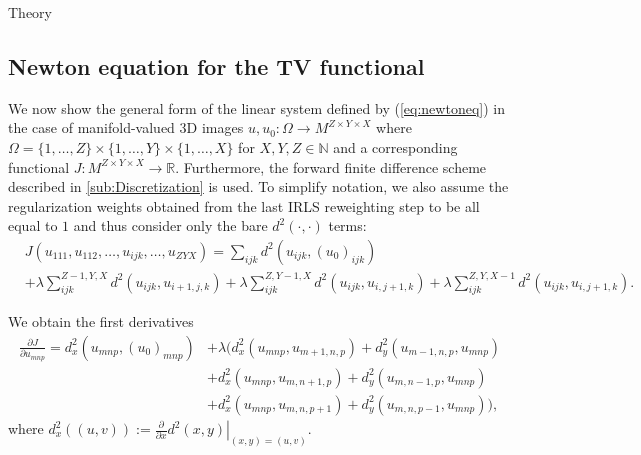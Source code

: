 \begin{chapter}{Theory}
\subsection{Newton equation for the TV functional} %
\label{sub:NewtonequationfortheTVfunctional}
We now show the general form of the linear system defined by (\ref{eq:newtoneq}) in the case of manifold-valued 3D images $u,u_0: \Omega\to M^{Z\times Y\times X}$
where $\Omega=\lbrace 1,\ldots, Z\rbrace\times\lbrace 1,\ldots, Y\rbrace\times\lbrace 1,\ldots, X\rbrace$ for $X,Y,Z\in\mathbb{N}$ and a corresponding functional $J:  M^{Z\times Y\times X} \to \mathbb{R}$.
Furthermore, the forward finite difference scheme described in \ref{sub:Discretization} is used. To simplify notation,
we also assume the regularization weights obtained from the last IRLS reweighting step to be all equal to $1$ and thus consider only the
bare $d^2(\cdot,\cdot)$ terms:
\begin{align}
    & J(u_{111},u_{112},\ldots,u_{ijk},\dots,u_{ZYX}) = \sum_{ijk} d^2(u_{ijk},(u_0)_{ijk}) \\ 
    &+ \lambda \sum_{ijk}^{Z-1,Y,X}d^{2}(u_{ijk},u_{i+1,j,k}) 
    + \lambda \sum_{ijk}^{Z,Y-1,X}d^{2}(u_{ijk},u_{i,j+1,k}) 
    + \lambda \sum_{ijk}^{Z,Y,X-1}d^{2}(u_{ijk},u_{i,j+1,k}). \nonumber 
\end{align}

We obtain the first derivatives
\begin{align}
    \label{eq:funcfirstder}
    \frac{\partial J}{\partial u_{mnp}} = d^2_x(u_{mnp},(u_0)_{mnp}) &+ \lambda 
	\big(
	    d_x^2(u_{mnp},u_{m+1,n,p}) +  d_y^2(u_{m-1,n,p},u_{mnp}) \\
	  &+  d_x^2(u_{mnp},u_{m,n+1,p}) +  d_y^2(u_{m,n-1,p},u_{mnp}) \nonumber \\
	  &+  d_x^2(u_{mnp},u_{m,n,p+1}) +  d_y^2(u_{m,n,p-1},u_{mnp})\big), \nonumber 
\end{align}
where $d^2_x((u,v)):=\frac{\partial}{\partial x}\left. d^2(x,y)\right\vert_{(x,y)=(u,v)}$.\\


\end{chapter}
